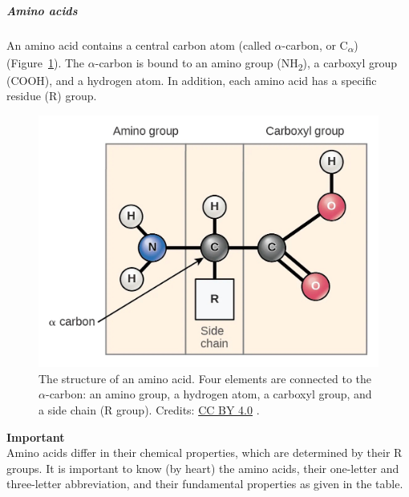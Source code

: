 \subparagraph{Amino acids}\label{chapter1_aminoacids}

An amino acid contains a central carbon atom (called $\alpha$-carbon, or C\textsubscript{$\alpha$}) (Figure~\ref{aminoacid}).
The $\alpha$-carbon is bound to an amino group (NH\textsubscript{2}), a carboxyl group (COOH), and a hydrogen atom. In addition, each amino acid has a specific residue (R) group.

\begin{figure}[!htbp]
\centering
\includegraphics[width=0.6\linewidth]{files/aminoacid-43fb3a83f9ded9cb29064fb29d80b29c.jpg}
\caption[]{The structure of an amino acid.
Four elements are connected to the $\alpha$-carbon: an amino group, a hydrogen atom, a carboxyl group, and a side chain (R group).
Credits: \href{https://creativecommons.org/licenses/by/4.0}{CC BY 4.0} \cite{proteins_2018}.}
\label{aminoacid}
\end{figure}

\begin{framed}
\textbf{Important}\\
Amino acids differ in their chemical properties, which are determined by their R groups.
It is important to know (by heart) the amino acids, their one-letter and three-letter abbreviation, and their fundamental properties as given in the table.
\end{framed}

